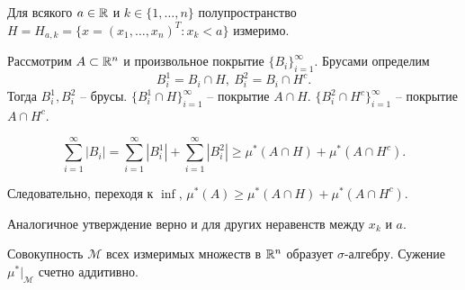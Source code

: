 \begin{example}
    \label{lebeg-ex2}
    Для всякого $a \in \mathbb{R}$ и $k \in \{1, \ldots, n\}$ полупространство $H = H_{a, k} = \{x = (x_{1}, \ldots, x_{n})^{T}: x_{k} < a\}$ измеримо.

    Рассмотрим $A \subset \mathbb{R}^{n}$ и произвольное покрытие $\{B_{i}\}_{i = 1}^{\infty}$. Брусами определим
    \[B_{i}^{1} = B_{i} \cap H, \ B_{i}^{2} = B_{i} \cap H^{c}.\]
    Тогда $B_{i}^{1}, B_{i}^{2}$ -- брусы. $\{B_{i}^{1} \cap H\}_{i = 1}^{\infty}$ -- покрытие $A \cap H$. $\{B_{i}^{2} \cap H^{c}\}_{i = 1}^{\infty}$ -- покрытие $A \cap H^{c}$.

    \[\sum_{i = 1}^{\infty}|B_{i}| = \sum_{i = 1}^{\infty}|B_{i}^{1}| + \sum_{i = 1}^{\infty}|B_{i}^{2}| \geq \mu^{*}(A \cap H) + \mu^{*}(A \cap H^{c}).\]

    Следовательно, переходя к $\inf$, $\mu^{*}(A) \geq \mu^{*}(A \cap H) + \mu^{*}(A \cap H^{c})$.

    Аналогичное утверждение верно и для других неравенств между $x_{k}$ и $a$.
\end{example}

\begin{theorem}[Каратеодори]
    Совокупность $\mathcal{M}$ всех измеримых множеств в $\mathbb{R}^{n}$ образует $\sigma$-алгебру. Сужение $\mu^{*}\lvert_{\mathcal{M}}$ счетно аддитивно.
\end{theorem}

